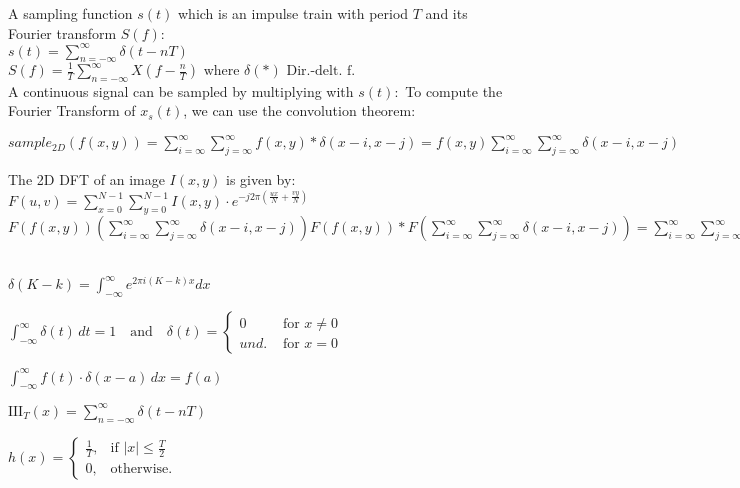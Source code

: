 \color{definitionColor}
 \color{black}

A sampling function $s(t)$ which is an impulse train with period $T$ and its Fourier transform $S(f)$:\\
\color{gray}
$s(t) = \sum_{n = -\infty}^\infty \delta\left(t - nT\right)$\\
$ S(f) = \frac{1}{T} \sum_{n = -\infty}^\infty X(f - \frac{n}{T}) \text{ where } \delta(*) \text{  Dir.-delt. f.}$\\
\color{black}
A continuous signal can be sampled by multiplying with $s(t):$ To compute the Fourier Transform of $x_s(t)$, we can use the convolution theorem:


 $sample_{2D} (f(x, y)) = \sum_{i = \infty}^{\infty} \sum_{j = \infty}^{\infty} f(x, y) * \delta(x - i, x - j) = f(x, y) \sum_{i = \infty}^{\infty}\sum_{j = \infty}^{\infty}\delta(x - i, x - j)$

The 2D DFT of an image \( I(x, y) \) is given by:
$F(u, v) = \sum_{x=0}^{N-1} \sum_{y=0}^{N-1} I(x, y) \cdot e^{-j2\pi\left(\frac{ux}{N} + \frac{vy}{N}\right)} $
$ F(f(x, y))  (\sum_{i = \infty}^{\infty}\sum_{j = \infty}^{\infty}\delta(x - i, x - j)) F(f(x, y)) * F( \sum_{i = \infty}^{\infty}\sum_{j = \infty}^{\infty}\delta(x - i, x - j)) =  \sum_{i = \infty}^{\infty}\sum_{j = \infty}^{\infty} F(u - i, v - j)$

 \\
$\delta (K - k) =  \int_{-\infty}^{\infty}e^{2 \pi i(K - k)x} dx$

$\int_{-\infty}^{\infty} \delta(t) \, dt = 1 \quad \text{and} \quad \delta(t) =  \begin{cases} 0 & \text{ for } x \neq 0 \\ und. & \text{ for } x = 0 \end{cases}$


\color{black} 
$\int_{-\infty}^{\infty} f(t) \cdot \delta(x - a) \, dx = f(a)$


$\text{III}_T(x) = \sum_{n=-\infty}^{\infty} \delta(t - nT)$

$h(x) = \begin{cases} 
\frac{1}{T}, & \text{if } |x| \leq \frac{T}{2} \\ 0, & \text{otherwise.} \end{cases}$

